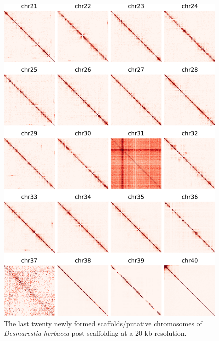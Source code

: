 \begin{suppsection}
\begin{figure}[ht]
\centering
    \includegraphics[width=13.5cm]{fig/instagraal/s6.png}
    \caption{The last twenty newly formed scaffolds/putative chromosomes of \textit{Desmarestia herbacea} post-scaffolding at a 20-kb resolution.}
    \label{fig:instagraal_s6}
\end{figure}


\end{suppsection}
